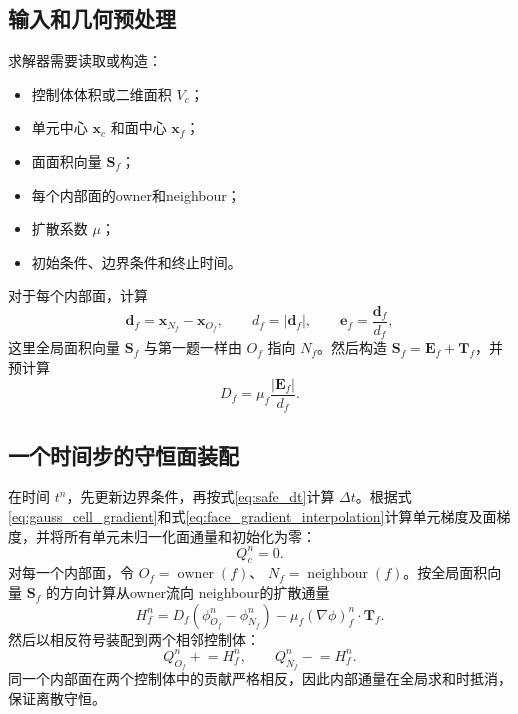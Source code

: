 \documentclass[UTF8,12pt,a4paper]{ctexart}
\numberwithin{equation}{section}
\newcommand{\Sf}{\bm S}
\newcommand{\xf}{\bm x}
\newcommand{\ef}{\bm e}
\newcommand{\Ef}{\bm E}
\newcommand{\Tf}{\bm T}
\begin{document}
\subsection{输入和几何预处理}

求解器需要读取或构造：
\begin{itemize}
  \item 控制体体积或二维面积 $V_c$；
  \item 单元中心 $\xf_c$ 和面中心 $\xf_f$；
  \item 面面积向量 $\Sf_f$；
  \item 每个内部面的owner和neighbour；
  \item 扩散系数 $\mu$；
  \item 初始条件、边界条件和终止时间。
\end{itemize}
对于每个内部面，计算
\begin{equation}
  \bm d_f=\xf_{N_f}-\xf_{O_f},
  \qquad
  d_f=|\bm d_f|,
  \qquad
  \ef_f=\frac{\bm d_f}{d_f},
  \label{eq:algorithm_geometry}
\end{equation}
这里全局面积向量 $\Sf_f$ 与第一题一样由 $O_f$ 指向 $N_f$。然后构造
$\Sf_f=\Ef_f+\Tf_f$，并预计算
\begin{equation}
  D_f=\mu_f\frac{|\Ef_f|}{d_f}.
  \label{eq:precompute_D}
\end{equation}

\subsection{一个时间步的守恒面装配}

在时间 $t^n$，先更新边界条件，再按式\eqref{eq:safe_dt}计算 $\Delta t$。根据式\eqref{eq:gauss_cell_gradient}和式\eqref{eq:face_gradient_interpolation}计算单元梯度及面梯度，并将所有单元未归一化面通量和初始化为零：
\begin{equation}
  Q_c^n=0.
  \label{eq:residual_zero}
\end{equation}
对每一个内部面，令 $O_f=\operatorname{owner}(f)$、
$N_f=\operatorname{neighbour}(f)$。按全局面积向量 $\Sf_f$ 的方向计算从owner流向
neighbour的扩散通量
\begin{equation}
  H_f^n
  =D_f(\phi_{O_f}^n-\phi_{N_f}^n)
  -\mu_f(\nabla\phi)_f^n\cdot\Tf_f.
  \label{eq:algorithm_face_flux}
\end{equation}
然后以相反符号装配到两个相邻控制体：
\begin{equation}
  Q_{O_f}^n\mathrel{+}=H_f^n,
  \qquad
  Q_{N_f}^n\mathrel{-}=H_f^n.
  \label{eq:owner_neighbour_assembly}
\end{equation}
同一个内部面在两个控制体中的贡献严格相反，因此内部通量在全局求和时抵消，保证离散守恒。
\end{document}
